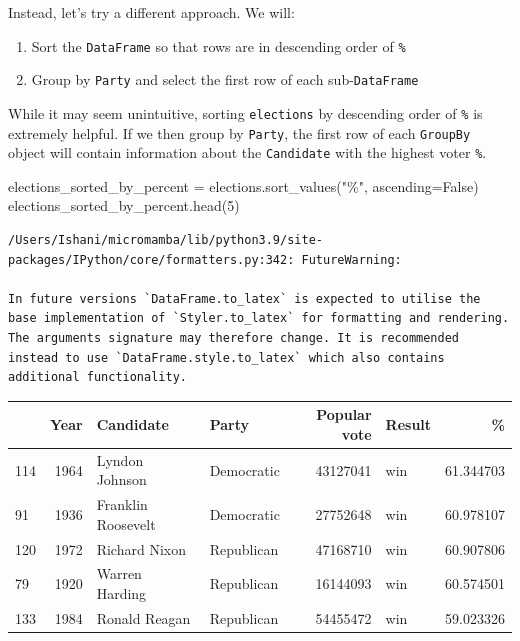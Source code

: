 \documentclass[
  letterpaper,
  DIV=11,
  numbers=noendperiod]{scrreprt}
\newenvironment{Shaded}{\begin{snugshade}}{\end{snugshade}}
\newcommand{\DecValTok}[1]{\textcolor[rgb]{0.68,0.00,0.00}{#1}}
\newcommand{\NormalTok}[1]{\textcolor[rgb]{0.00,0.23,0.31}{#1}}
\newcommand{\OperatorTok}[1]{\textcolor[rgb]{0.37,0.37,0.37}{#1}}
\newcommand{\StringTok}[1]{\textcolor[rgb]{0.13,0.47,0.30}{#1}}
\newcommand{\VariableTok}[1]{\textcolor[rgb]{0.07,0.07,0.07}{#1}}
\providecommand{\tightlist}{%
  \setlength{\itemsep}{0pt}\setlength{\parskip}{0pt}}\usepackage{longtable,booktabs,array}
\begin{document}
Instead, let's try a different approach. We will:

\begin{enumerate}
\def\labelenumi{\arabic{enumi}.}
\tightlist
\item
  Sort the \texttt{DataFrame} so that rows are in descending order of
  \texttt{\%}
\item
  Group by \texttt{Party} and select the first row of each
  sub-\texttt{DataFrame}
\end{enumerate}

While it may seem unintuitive, sorting \texttt{elections} by descending
order of \texttt{\%} is extremely helpful. If we then group by
\texttt{Party}, the first row of each \texttt{GroupBy} object will
contain information about the \texttt{Candidate} with the highest voter
\texttt{\%}.

\begin{Shaded}
\begin{Highlighting}[]
\NormalTok{elections\_sorted\_by\_percent }\OperatorTok{=}\NormalTok{ elections.sort\_values(}\StringTok{"\%"}\NormalTok{, ascending}\OperatorTok{=}\VariableTok{False}\NormalTok{)}
\NormalTok{elections\_sorted\_by\_percent.head(}\DecValTok{5}\NormalTok{)}
\end{Highlighting}
\end{Shaded}

\begin{verbatim}
/Users/Ishani/micromamba/lib/python3.9/site-packages/IPython/core/formatters.py:342: FutureWarning:

In future versions `DataFrame.to_latex` is expected to utilise the base implementation of `Styler.to_latex` for formatting and rendering. The arguments signature may therefore change. It is recommended instead to use `DataFrame.style.to_latex` which also contains additional functionality.
\end{verbatim}

\begin{tabular}{lrllrlr}
\toprule
{} &  Year &           Candidate &       Party &  Popular vote & Result &          \% \\
\midrule
114 &  1964 &      Lyndon Johnson &  Democratic &      43127041 &    win &  61.344703 \\
91  &  1936 &  Franklin Roosevelt &  Democratic &      27752648 &    win &  60.978107 \\
120 &  1972 &       Richard Nixon &  Republican &      47168710 &    win &  60.907806 \\
79  &  1920 &      Warren Harding &  Republican &      16144093 &    win &  60.574501 \\
133 &  1984 &       Ronald Reagan &  Republican &      54455472 &    win &  59.023326 \\
\bottomrule
\end{tabular}
\end{document}
